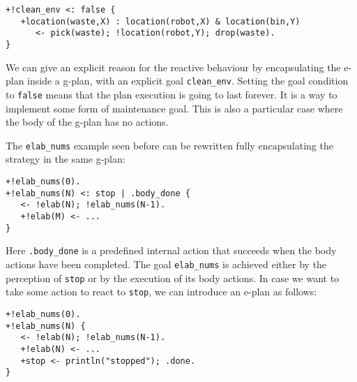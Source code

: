 \begin{small}
\begin{verbatim}
+!clean_env <: false {
   +location(waste,X) : location(robot,X) & location(bin,Y)
      <- pick(waste); !location(robot,Y); drop(waste).
}
\end{verbatim}
\end{small}

\noindent We can give an explicit reason for the reactive behaviour by encapsulating the e-plan inside a g-plan, with an explicit goal \texttt{clean\_env}.
%
Setting the goal condition to \texttt{false} means that the plan
execution is going to last forever. It is a way to implement some form
of maintenance goal.
%
This is also a particular case where the body of the g-plan has no actions.
%

The \texttt{elab\_nums} example seen before can be rewritten fully encapsulating the strategy in the same g-plan:

{\small
\begin{verbatim}
+!elab_nums(0).
+!elab_nums(N) <: stop | .body_done {
   <- !elab(N); !elab_nums(N-1).	
   +!elab(M) <- ...
}
\end{verbatim}}

\noindent Here \texttt{.body\_done} is a predefined internal action that succeeds when the body actions have been completed. The goal \texttt{elab\_nums} is achieved either by the perception of \texttt{stop} or by the execution of its body actions.
%
In case we want to take some action to react to \texttt{stop}, we can introduce an e-plan as follows:

{\small
\begin{verbatim}
+!elab_nums(0).
+!elab_nums(N) {
   <- !elab(N); !elab_nums(N-1).
   +!elab(N) <- ...
   +stop <- println("stopped"); .done.
}
\end{verbatim}}

